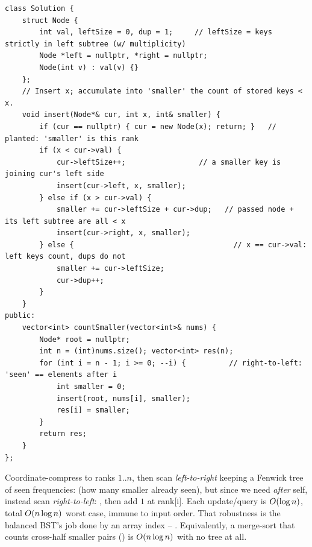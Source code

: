 \begin{lstlisting}[caption={Count of Smaller Numbers After Self -- size-augmented BST (LeetCode 315, rung 3; correct but $O(n^2)$ worst case on sorted input)}, label={lst:c05-summit}]
class Solution {
    struct Node {
        int val, leftSize = 0, dup = 1;     // leftSize = keys strictly in left subtree (w/ multiplicity)
        Node *left = nullptr, *right = nullptr;
        Node(int v) : val(v) {}
    };
    // Insert x; accumulate into 'smaller' the count of stored keys < x.
    void insert(Node*& cur, int x, int& smaller) {
        if (cur == nullptr) { cur = new Node(x); return; }   // planted: 'smaller' is this rank
        if (x < cur->val) {
            cur->leftSize++;                 // a smaller key is joining cur's left side
            insert(cur->left, x, smaller);
        } else if (x > cur->val) {
            smaller += cur->leftSize + cur->dup;   // passed node + its left subtree are all < x
            insert(cur->right, x, smaller);
        } else {                                     // x == cur->val: left keys count, dups do not
            smaller += cur->leftSize;
            cur->dup++;
        }
    }
public:
    vector<int> countSmaller(vector<int>& nums) {
        Node* root = nullptr;
        int n = (int)nums.size(); vector<int> res(n);
        for (int i = n - 1; i >= 0; --i) {          // right-to-left: 'seen' == elements after i
            int smaller = 0;
            insert(root, nums[i], smaller);
            res[i] = smaller;
        }
        return res;
    }
};
\end{lstlisting}
\begin{notebox}
Coordinate-compress  to ranks $1..n$, then scan \emph{left-to-right} keeping a Fenwick tree
of seen frequencies:  (how many smaller already seen), but since we
need \emph{after} self, instead scan \emph{right-to-left}: , then add $1$ at rank[i]. Each update/query is $O(\log n)$, total
$O(n\log n)$ worst case, immune to input order. That robustness is the balanced BST's job done by
an array index -- . Equivalently, a merge-sort that counts cross-half smaller pairs
() is $O(n\log n)$ with no tree at all.
\end{notebox}

